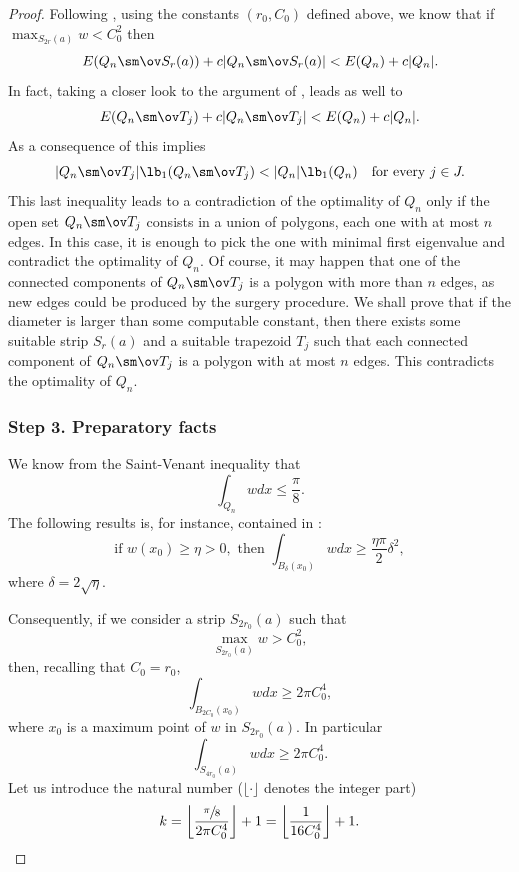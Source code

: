 \begin{proof}
Following \cite[Cor.\,4.3]{BuMa15}, using the constants $(r_0, C_0)$ defined above, we know that
if $\max_{S_{2r}(a) } w <C_0^2$ then
\begin{equation}\label{bb62}
E(Q_n\sm \ov S_{r}(a))+c |Q_n\sm \ov S_{r}(a)|< E(Q_n)+c |Q_n|.
\end{equation}
In fact, taking a closer look to the argument of \cite[Cor.\,4.3]{BuMa15}, leads as well to
\begin{equation}\label{bb62.5}
E(Q_n\sm \ov T_j)+c |Q_n\sm \ov T_j|< E(Q_n)+c |Q_n|.
\end{equation}
As a consequence of \cite[Lem.\,3.1]{BuMa15} this implies
\[
|Q_n\sm \ov T_j|\lb_1(Q_n\sm \ov T_j) < |Q_n| \lb_1(Q_n) \quad\text{for every } j \in J.
\]
This last inequality leads to a contradiction of the optimality of $Q_n$ only if the open set $Q_n\sm \ov T_j$ consists in a union of polygons, each one with at most $n$ edges. In this case, it is enough to pick the one with minimal first eigenvalue and contradict the optimality of $Q_n$. Of course, it may happen that one of the connected components of $Q_n\sm \ov T_j$ is a polygon with more than $n$ edges, as new edges could be produced by the surgery procedure. We shall prove that if the diameter is larger than some computable constant, then there exists some suitable strip $S_{r}(a)$ and a suitable {trapezoid} $T_j$ such that each connected component of $Q_n\sm \ov T_j$ is a polygon with at most $n$ edges. This contradicts the optimality of $Q_n$.

\subsubsection*{Step 3. Preparatory facts} We know from the Saint-Venant inequality \cite{Ma66} that
\[
\int_{Q_n} w dx \le \frac{\pi}{8}.
\]
The following results is, for instance, contained in \cite[Lem.\,2.2]{BuMa15}:
\[
\text{if } w(x_0) \ge \eta >0, \text{ then } \int _{B_\delta (x_0)} w dx\ge \frac{\eta \pi}{2} \delta^2,
\]
where $\delta = 2 \sqrt{\eta}$.

Consequently, if we consider a strip $S_{2r_0}(a)$ such that
\[
\max _{S_{2r_0}(a)} w >C_0^2,
\]
then, recalling that $C_0=r_0$,
\[
\int_{B_{2C_0} (x_0)} w dx \ge 2\pi C_0^4,
\]
where $x_0$ is a maximum point of $w$ in $S_{2r_0}(a)$. In particular
\[
\int_{S_{4r_0}(a)} w dx \ge 2\pi C_0^4.
\]
Let us introduce the natural number ($\lfloor \cdot \rfloor$ denotes the integer part)
\[
k= \left\lfloor\frac{\sfrac {\pi}{8}}{2\pi C_0^4}\right \rfloor +1= \left \lfloor\frac{1}{16C_0^4}\right \rfloor +1.
\]


\end{proof}
